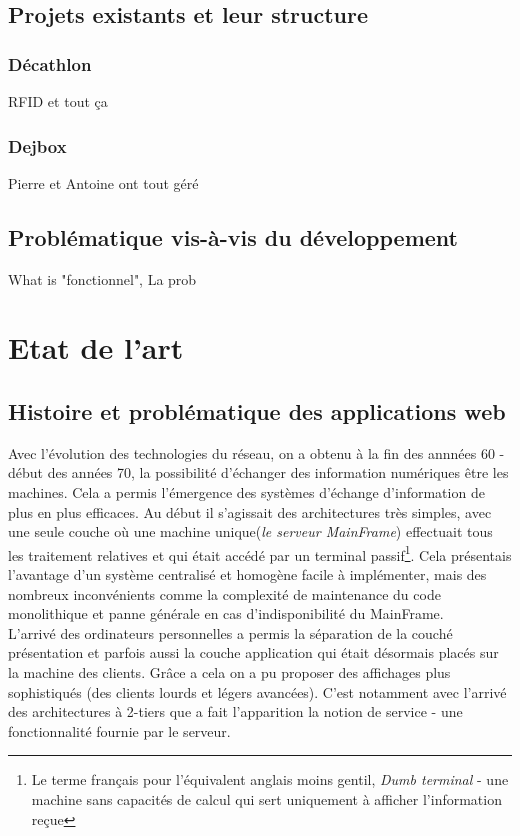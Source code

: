 \subsection{Projets existants et leur structure}
\subsubsection{Décathlon}
RFID et tout ça
\subsubsection{Dejbox}
Pierre et Antoine ont tout géré 

\subsection{Problématique vis-à-vis du développement}
What is "fonctionnel", La prob















\newpage


\section{Etat de l'art}

\subsection{Histoire et problématique des applications web}
Avec l'évolution des technologies du réseau, on a obtenu à la fin des annnées 60 - début des années 70,  la possibilité d'échanger des information numériques être les machines. Cela a permis l'émergence des systèmes d'échange d'information de plus en plus efficaces. Au début il s'agissait des architectures très simples, avec une seule couche où une machine unique(\emph{le serveur MainFrame}) effectuait tous les traitement relatives et qui était accédé par un terminal passif\footnote{Le terme français pour l'équivalent anglais moins gentil, \emph{Dumb terminal} - une machine sans capacités de calcul qui sert uniquement à afficher l'information reçue}. Cela présentais l'avantage d'un système centralisé et homogène facile à implémenter, mais des nombreux inconvénients comme la complexité de maintenance du code monolithique et panne générale en cas d'indisponibilité du MainFrame.  
\\
L'arrivé des ordinateurs personnelles a permis la séparation de la couché présentation et parfois aussi la couche application qui était désormais placés sur la machine des clients. Grâce a cela on a pu proposer des affichages plus sophistiqués (des clients lourds et légers avancées). C'est notamment avec l'arrivé des architectures à 2-tiers que a fait l'apparition la notion de service - une fonctionnalité fournie par le serveur.


